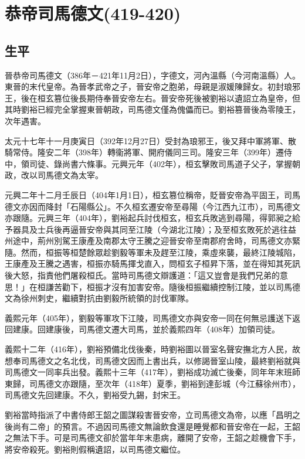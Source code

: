 
\section{恭帝司馬德文\tiny(419-420)}

\subsection{生平}

晉恭帝司馬德文（386年－421年11月2日），字德文，河內溫縣（今河南溫縣）人。東晉的末代皇帝。為晉孝武帝之子，晉安帝之胞弟，母親是淑媛陳歸女。初封琅邪王，後在桓玄篡位後長期侍奉晉安帝左右。晉安帝死後被劉裕以遺詔立為皇帝，但其時劉裕已經完全掌握東晉朝政，司馬德文僅為傀儡而已。劉裕篡晉後為零陵王，次年遇害。

太元十七年十一月庚寅日（392年12月27日）受封為琅邪王，後又拜中軍將軍、散騎常侍。隆安二年（398年）轉衞將軍、開府儀同三司。隆安三年（399年）遷侍中，領司徒、錄尚書六條事。元興元年（402年），桓玄擊敗司馬道子父子，掌握朝政，改以司馬德文為太宰。

元興二年十二月壬辰日（404年1月1日），桓玄篡位稱帝，貶晉安帝為平固王，司馬德文亦因而降封「石陽縣公」。不久桓玄遷安帝至尋陽（今江西九江市），司馬德文亦跟隨。元興三年（404年），劉裕起兵討伐桓玄，桓玄兵敗逃到尋陽，得郭昶之給予器具及士兵後再逼晉安帝與其同至江陵（今湖北江陵）；及至桓玄敗死於逃往益州途中，荊州別駕王康產及南郡太守王騰之迎晉安帝至南郡府舍時，司馬德文亦緊隨。然而，桓振等桓楚餘眾趁劉毅等軍未及趕至江陵，乘虛來襲，最終江陵城陷，王康產及王騰之遇害，桓振亦騎馬揮戈直入，問桓玄子桓昇下落，並在得知其死訊後大怒，指責他們屠殺桓氏。當時司馬德文辯護道：「這又豈會是我們兄弟的意思！」在桓謙苦勸下，桓振才沒有加害安帝。隨後桓振繼續控制江陵，並以司馬德文為徐州刺史，繼續對抗由劉毅所統領的討伐軍隊。

義熙元年（405年），劉毅等軍攻下江陵，司馬德文亦與安帝一同在何無忌護送下返回建康。回建康後，司馬德文遷大司馬，並於義熙四年（408年）加領司徒。

義熙十二年（416年），劉裕預備北伐後秦，時劉裕圖以晉室名聲安撫北方人民，故想奉司馬德文之名北伐，司馬德文因而上書出兵，以修謁晉室山陵，最終劉裕就與司馬德文一同率兵出發。義熙十三年（417年），劉裕成功滅亡後秦，同年年末班師東歸，司馬德文亦跟隨，至次年（418年）夏季，劉裕到達彭城（今江蘇徐州市），司馬德文先回建康。不久，劉裕受九錫，封宋王。

劉裕當時指派了中書侍郎王韶之圖謀殺害晉安帝，立司馬德文為帝，以應「昌明之後尚有二帝」的預言。不過因司馬德文無論飲食還是睡覺都和晉安帝在一起，王韶之無法下手。可是司馬德文卻於當年年末患病，離開了安帝，王韶之趁機會下手，將安帝殺死。劉裕則假稱遺詔，以司馬德文繼位。

